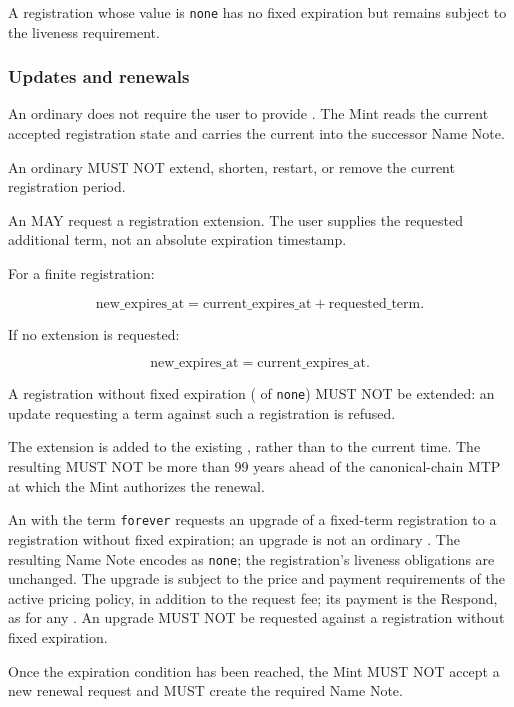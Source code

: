 A registration whose  value is \texttt{none} has no fixed expiration but remains subject to the liveness requirement.

\subsubsection{Updates and renewals}

An ordinary  does not require the user to provide . The Mint reads the current accepted registration state and carries the current  into the successor Name Note.

An ordinary  MUST NOT extend, shorten, restart, or remove the current registration period.

An  MAY request a registration extension. The user supplies the requested additional term, not an absolute expiration timestamp.

For a finite registration:

$$\text{new\_expires\_at} = \text{current\_expires\_at} + \text{requested\_term}.$$

If no extension is requested:

$$\text{new\_expires\_at} = \text{current\_expires\_at}.$$

A registration without fixed expiration ( of \texttt{none}) MUST NOT be extended: an update requesting a term against such a registration is refused.

The extension is added to the existing , rather than to the current time. The resulting  MUST NOT be more than 99 years ahead of the canonical-chain MTP at which the Mint authorizes the renewal.

An  with the term \texttt{forever} requests an upgrade of a fixed-term registration to a registration without fixed expiration; an upgrade is not an ordinary . The resulting Name Note encodes  as \texttt{none}; the registration's liveness obligations are unchanged. The upgrade is subject to the price and payment requirements of the active pricing policy, in addition to the request fee; its payment is the Respond, as for any . An upgrade MUST NOT be requested against a registration without fixed expiration.

Once the expiration condition has been reached, the Mint MUST NOT accept a new renewal request and MUST create the required  Name Note.

